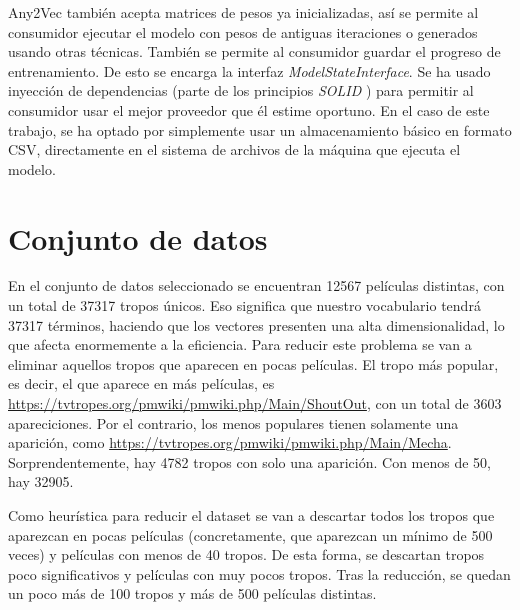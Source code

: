 Any2Vec también acepta matrices de pesos ya inicializadas, así se permite al consumidor ejecutar el modelo con pesos de antiguas iteraciones o generados usando otras técnicas. También se permite
al consumidor guardar el progreso de entrenamiento. De esto se encarga la interfaz \textit{ModelStateInterface}. Se ha usado inyección de dependencias (parte de los principios \textit{SOLID} \cite{martin2000design})
para permitir al consumidor usar el mejor proveedor que él estime oportuno. En el caso de este trabajo, se ha optado por simplemente usar un almacenamiento básico en formato CSV, directamente en el sistema de
archivos de la máquina que ejecuta el modelo.

\section{Conjunto de datos}

En el conjunto de datos seleccionado se encuentran 12567 películas distintas, con un total de 37317 tropos únicos. Eso significa que nuestro vocabulario tendrá 37317 términos, haciendo que
los vectores presenten una alta dimensionalidad, lo que afecta enormemente a la eficiencia. Para reducir este problema se van a eliminar aquellos tropos que aparecen en pocas películas.
El tropo más popular, es decir, el que aparece en más películas, es \href{\textit{Shout-Out}}{https://tvtropes.org/pmwiki/pmwiki.php/Main/ShoutOut}, con un total de 3603 apareciciones.
Por el contrario, los menos populares tienen solamente una aparición, como \href{\textit{Mecha}}{https://tvtropes.org/pmwiki/pmwiki.php/Main/Mecha}. Sorprendentemente, hay 4782 tropos con solo una aparición. Con menos
de 50, hay 32905.

Como heurística para reducir el dataset se van a descartar todos los tropos que aparezcan en pocas películas (concretamente, que aparezcan un mínimo de 500 veces) y películas con menos de 40 tropos.
De esta forma, se descartan tropos poco significativos y películas con muy pocos tropos. Tras la reducción, se quedan un poco más de 100 tropos y más de 500 películas distintas.